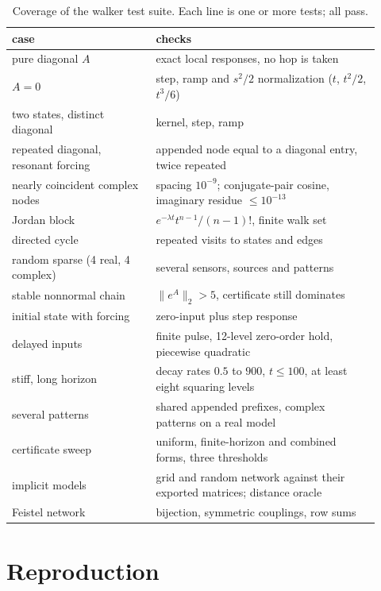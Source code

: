 \documentclass[aps,pra,superscriptaddress,floatfix,longbibliography,twocolumn]{revtex4-2}
\begin{document}
\begin{table}[h]
\caption{Coverage of the walker test suite. Each line is one or more tests; all pass.}\label{tab:tests}
\begin{ruledtabular}
\footnotesize
\begin{tabular}{p{0.36\linewidth}p{0.56\linewidth}}
case & checks\\\hline
pure diagonal $A$ & exact local responses, no hop is taken\\
$A=0$ & step, ramp and $s^2/2$ normalization ($t$, $t^2/2$, $t^3/6$)\\
two states, distinct diagonal & kernel, step, ramp\\
repeated diagonal, resonant forcing & appended node equal to a diagonal entry, twice repeated\\
nearly coincident complex nodes & spacing $10^{-9}$; conjugate-pair cosine, imaginary residue $\le10^{-13}$\\
Jordan block & $e^{-\lambda t}t^{n-1}/(n-1)!$, finite walk set\\
directed cycle & repeated visits to states and edges\\
random sparse (4 real, 4 complex) & several sensors, sources and patterns\\
stable nonnormal chain & $\|e^{A}\|_2>5$, certificate still dominates\\
initial state with forcing & zero-input plus step response\\
delayed inputs & finite pulse, 12-level zero-order hold, piecewise quadratic\\
stiff, long horizon & decay rates $0.5$ to $900$, $t\le100$, at least eight squaring levels\\
several patterns & shared appended prefixes, complex patterns on a real model\\
certificate sweep & uniform, finite-horizon and combined forms, three thresholds\\
implicit models & grid and random network against their exported matrices; distance oracle\\
Feistel network & bijection, symmetric couplings, row sums\\
\end{tabular}
\end{ruledtabular}
\end{table}
\section{Reproduction}\label{app:repro}
\end{document}
